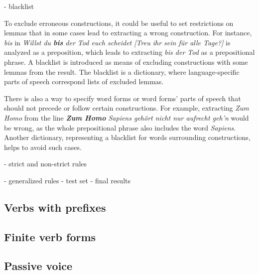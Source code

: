 - blacklist

To exclude erroneous constructions, it could be useful to set restrictions on lemmas that in some cases lead to extracting a wrong construction. For instance, \textit{bis} in \textit{Willst du \textbf{bis} der Tod euch scheidet [Treu ihr sein für alle Tage?]} is analyzed as a preposition, which leads to extracting \textit{bis der Tod} as a prepositional phrase. A blacklist is introduced as means of excluding constructions with some lemmas from the result. The blacklist is a dictionary, where language-specific parts of speech correspond lists of excluded lemmas.

There is also a way to specify word forms or word forms' parts of speech that should not precede or follow certain constructions. For example, extracting \textit{Zum Homo} from the line \textit{\textbf{Zum Homo} Sapiens gehört nicht nur aufrecht geh'n} would be wrong, as the whole prepositional phrase also includes the word \textit{Sapiens}. Another dictionary, representing a blacklist for words surrounding constructions, helps to avoid such cases.

- strict and non-strict rules



- generalized rules
- test set
- final results

\subsection{Verbs with prefixes}

\subsection{Finite verb forms}

\subsection{Passive voice}